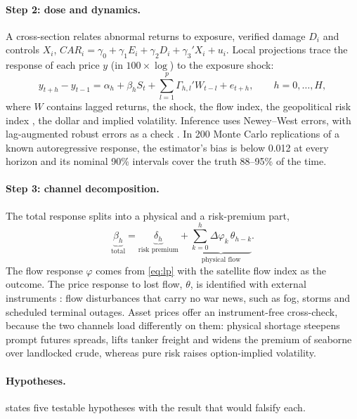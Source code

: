 \documentclass{article}
\begin{document}
\paragraph{Step 2: dose and dynamics.} A cross-section relates abnormal returns to exposure, verified damage $D_i$ and controls $X_i$, $CAR_i = \gamma_0 + \gamma_1 E_i + \gamma_2 D_i + \gamma_3' X_i + u_i$. Local projections \citep{jorda2005} trace the response of each price $y$ (in $100\times\log$) to the exposure shock:
\begin{equation}
  y_{t+h} - y_{t-1} = \alpha_h + \beta_h S_t + \sum_{l=1}^{p} \Gamma_{h,l}' W_{t-l} + e_{t+h}, \qquad h = 0,\dots,H,
  \label{eq:lp}
\end{equation}
where $W$ contains lagged returns, the shock, the flow index, the geopolitical risk index \citep{caldara2022}, the dollar and implied volatility. Inference uses Newey--West errors, with lag-augmented robust errors as a check \citep{montiel2021}. In 200 Monte Carlo replications of a known autoregressive response, the estimator's bias is below 0.012 at every horizon and its nominal 90\% intervals cover the truth 88--95\% of the time.

\paragraph{Step 3: channel decomposition.} The total response splits into a physical and a risk-premium part,
\begin{equation}
  \underbrace{\beta_h}_{\text{total}} = \underbrace{\delta_h}_{\text{risk premium}} + \underbrace{\textstyle\sum_{k=0}^{h} \Delta\varphi_k\,\theta_{h-k}}_{\text{physical flow}} .
  \label{eq:decomp}
\end{equation}
The flow response $\varphi$ comes from \cref{eq:lp} with the satellite flow index as the outcome. The price response to lost flow, $\theta$, is identified with external instruments \citep{stockwatson2018}: flow disturbances that carry no war news, such as fog, storms and scheduled terminal outages. Asset prices offer an instrument-free cross-check, because the two channels load differently on them: physical shortage steepens prompt futures spreads, lifts tanker freight and widens the premium of seaborne over landlocked crude, whereas pure risk raises option-implied volatility.

\paragraph{Hypotheses.}  states five testable hypotheses with the result that would falsify each.
\end{document}
